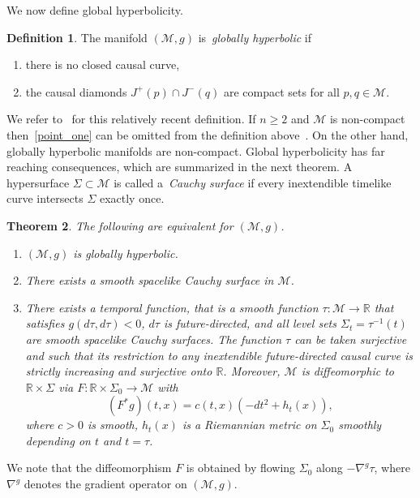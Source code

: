 \documentclass[12pt,reqno]{amsart}
\numberwithin{equation}{section}
\theoremstyle{definition}
\theoremstyle{plain}
\newtheorem{theorem}{Theorem}[section]
\theoremstyle{definition}
\newtheorem{definition}[theorem]{Definition}
\theoremstyle{definition}
\newcommand{\R}{\mathbb{R}}
\newcommand{\M}{\mathcal{M}}
\def\R{\mathbb R}
\begin{document}
 We now define global hyperbolicity.
\begin{definition}
    The manifold $(\M, g)$ is~\textit{globally hyperbolic} if
    \begin{enumerate}
        \item \label{point_one} there is no closed causal curve,

        \item \label{point_two} the causal diamonds $J^+(p) \cap J^-(q)$ are compact sets for all $p, q \in \M$.
    \end{enumerate}
\end{definition}



We refer to~\cite{hounnonkpe2019} for this relatively recent definition. If $n \geq 2$ and $\M$ is non-compact then~\eqref{point_one} can be omitted from the definition above~\cite{hounnonkpe2019}. On the other hand, globally hyperbolic manifolds are non-compact. Global hyperbolicity has far reaching consequences, which are summarized in the next theorem. A hypersurface $\Sigma \subset \M$ is called a~\textit{Cauchy surface} if every inextendible timelike curve intersects $\Sigma$ exactly once.

\begin{theorem}
\label{prop_of_globhyper}
    The following are equivalent for $(\M, g)$.

\begin{enumerate}
    \item $(\M, g)$ is globally hyperbolic.

    \item There exists a smooth spacelike Cauchy surface in $\M$.

    \item There exists a temporal function, that is a smooth function $\tau : \M \to \R$ that satisfies $g(d \tau,d \tau)<0$, $d \tau $ is future-directed, and all level sets $\Sigma_t=\tau^{-1}(t)$ are smooth spacelike Cauchy surfaces. The function $\tau$ can be taken surjective and such that its restriction to any inextendible future-directed causal curve is strictly increasing and surjective onto $\R$. Moreover, $\M$ is diffeomorphic to $\R \times \Sigma$ via  $F :\R \times \Sigma_0 \to \M$ with
    \begin{equation}
        (F^*g)(t,x)=c(t,x)(-dt^2+h_t(x)),
    \end{equation}
 where $c>0$ is smooth, $h_t(x)$ is a Riemannian metric on $\Sigma_0$ smoothly depending on $t$ and $t=\tau$.
\end{enumerate}
\end{theorem}
We note that the diffeomorphism $F$ is obtained by flowing $\Sigma_0$ along $-\nabla^{g} \tau$, where $\nabla^{g}$ denotes the gradient operator on $(\M, g).$
\end{document}
